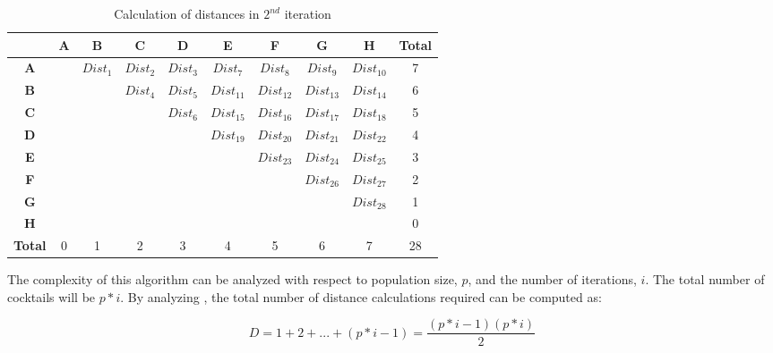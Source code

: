 \begin{table}[htbp]
\begin{center}
\caption{Calculation of distances in $2^{nd}$ iteration}
\begin{tabular}{|c|c|c|c|c|c|c|c|c|c|}
\hline
 & \textbf{A} & \textbf{B} & \textbf{C} & \textbf{D} & \textbf{E} & \textbf{F} & \textbf{G} & \textbf{H} & \textbf{Total} \\
\hline
\textbf{A} &  & $Dist_{1}$ & $Dist_{2}$ & $Dist_{3}$ & $Dist_{7}$ & $Dist_{8}$ & $Dist_{9}$ & $Dist_{10}$ & 7 \\
\hline
\textbf{B} &  &  & $Dist_{4}$ & $Dist_{5}$ & $Dist_{11}$ & $Dist_{12}$ & $Dist_{13}$ & $Dist_{14}$ & 6 \\
\hline
\textbf{C} &  &  &  & $Dist_{6}$ & $Dist_{15}$ & $Dist_{16}$ & $Dist_{17}$ & $Dist_{18}$ & 5 \\
\hline
\textbf{D} &  &  &  &   & $Dist_{19}$ & $Dist_{20}$ & $Dist_{21}$ & $Dist_{22}$ & 4 \\
\hline
\textbf{E} &  &  &  &   & & $Dist_{23}$ & $Dist_{24}$ & $Dist_{25}$ & 3 \\
\hline
\textbf{F} &  &  &  &   &  & & $Dist_{26}$ & $Dist_{27}$ & 2 \\
\hline
\textbf{G} &  &  &  &   & & &  & $Dist_{28}$ & 1 \\
\hline
\textbf{H} &  &  &  &   & & & & & 0 \\
\hline
\textbf{Total} & 0 & 1 & 2 & 3 & 4 & 5 & 6 & 7 & 28 \\
\hline
\end{tabular}
\label{iteration_2_methodology_table}
\end{center}
\end{table}



The complexity of this algorithm can be analyzed with respect to population size, $p$, and the number of iterations, $i$.
The total number of cocktails will be $p*i$. By analyzing  , the total number of distance calculations required can be computed as:

\begin{equation}
D = 1 + 2 + ... + (p*i - 1) =\frac{(p*i - 1)(p*i)}{2}\label{eq}
\end{equation}


